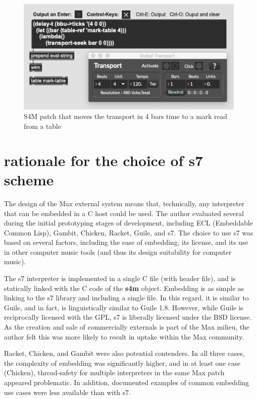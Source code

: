 \documentclass[acmsmall, anonymous, review]{acmart}
\begin{document}
\begin{figure}[H]
  \centering
  \includegraphics[width=.75\linewidth]{fig-3-transport}
  \caption{S4M patch that moves the transport in 4 bars time to a mark read from a table}
\end{figure}


\section{rationale for the choice of s7 scheme}

The design of the Max external system means that, technically, any interpreter
that can be embedded in a C host could be used. The author evaluated several during
the initial prototyping stages of development, including ECL (Embeddable Common Lisp),
Gambit, Chicken, Racket, Guile, and s7. The choice to use s7 was based on several 
factors, including the ease of embedding, its license, and its use in other computer music tools (and
thus its design suitability for computer music).

The s7 interpreter is implemented in a single C file (with header file), 
and is statically linked with the C code of the \textbf{s4m} object. Embedding is
as simple as linking to the s7 library and including a single file. In this 
regard, it is similar to Guile, and in fact, is linguistically similar to Guile 1.8.
However, while Guile is reciprocally licensed with the GPL, s7 is liberally licensed 
under the BSD license. As the creation and sale of commercially externals is part of the Max 
milieu, the author felt this was more likely to result in uptake within the Max community.

Racket, Chicken, and Gambit were also potential contenders. In all three cases, the
complexity of embedding was significantly higher, and in at least one case (Chicken),
thread-safety for multiple interpreters in the same Max patch appeared problematic.
In addition, documented examples of common embedding use cases were less available
than with s7.
\end{document}
